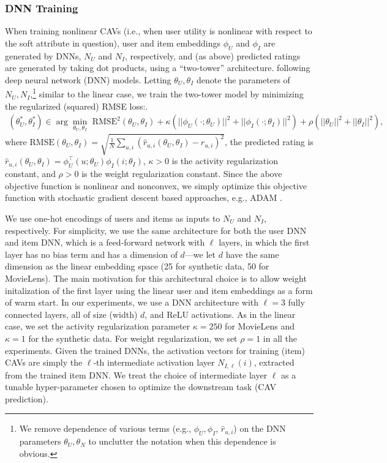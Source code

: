 \documentclass[manuscript,screen,nonacm]{acmart}
\newcommand{\1}{{\mathbf 1}}
\newcommand{\hatr}{\hat{r}}
\theoremstyle{TheoremNum}
\begin{document}
\subsubsection{DNN Training}
\label{app:DNN_training}
When training nonlinear CAVs (i.e., when user utility is nonlinear with respect to the soft attribute in question),
user and item embeddings $\phi_U$ and $\phi_I$ are generated by DNNs, $N_U$ and $N_I$, respectively, and (as above) predicted ratings are generated by taking dot products, using a ``two-tower'' architecture. following deep neural network (DNN) models. Letting $\theta_U, \theta_I$ denote the parameters of $N_U, N_I$,\footnote{We remove dependence of various terms (e.g., $\phi_U, \phi_I$, $\hatr_{u,i}$) on the DNN parameters $\theta_U, \theta_N$ to unclutter the notation when this dependence is obvious.}
similar to the linear case, we train the two-tower model by minimizing the regularized (squared) RMSE loss:.
\begin{align}
(\theta_U^*, \theta_I^*)\in\arg\min_{\theta_U,\theta_I}\,\,\text{RMSE}^2(\theta_U,\theta_I)+ \kappa(||\phi_U(\cdot;\theta_U)||^2 + ||\phi_I(\cdot;\theta_I)||^2)+ \rho(||\theta_U||^2 + ||\theta_I||^2),
\end{align}
where $\text{RMSE}(\theta_U,\theta_I) =\sqrt{\frac{1}{N}\sum_{u,i}(\hatr_{u,i}(\theta_U,\theta_I)-r_{u,i})^2}$, the predicted rating is $\hatr_{u,i}(\theta_U,\theta_I) = \phi^\top_{U}(u;\theta_U) \phi_{I}(i;\theta_I)$, $\kappa>0$ is the activity regularization constant, and $\rho>0$ is the weight regularization constant. Since the above objective function is nonlinear and nonconvex, we simply optimize this objective function with stochastic gradient descent based approaches, e.g., ADAM \cite{adam}.


We use one-hot encodings of users and items as inputs to $N_U$
and $N_I$, respectively. For simplicity, we use the same architecture for both the user DNN and item DNN, which is a feed-forward network with $\ell$ layers, in which the first layer has no bias term and has a dimension of $d$---we let $d$ have the same dimension as the linear embedding space (25 for synthetic data, 50 for MovieLens). The main motivation for this architectural choice is to allow weight initalization of the first layer using the linear user and item embeddings as a form of warm start. In our experiments, we use a DNN architecture with $\ell = 3$ fully connected layers, all of size (width) $d$, and ReLU activations. As in the linear case, we set the activity regularization parameter $\kappa = 250$ for MovieLens and $\kappa = 1$ for the synthetic data. For weight regularization, we set $\rho = 1$ in all the experiments. Given the trained DNNs, the activation vectors for training (item) CAVs are simply the $\ell$-th intermediate activation layer $N_{I,\ell}(i)$, extracted from the trained item DNN.
We treat the choice of intermediate layer $\ell$ as a tunable hyper-parameter chosen to optimize the downstream task (CAV prediction). 
\end{document}
